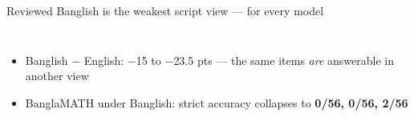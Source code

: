 \documentclass[aspectratio=169,10pt]{beamer}
\begin{document}
\begin{frame}{Reviewed Banglish is the weakest script view --- for every model}
\begin{columns}[T]
{\begin{itemize}
        \item Banglish $-$ English: $-$15 to $-$23.5 pts --- the same items \emph{are}
              answerable in another view
        \item BanglaMATH under Banglish: strict accuracy collapses to
              \textbf{0/56, 0/56, 2/56}
      \end{itemize}\par}
      \vspace{4pt}
  \end{columns}
\end{frame}
\end{document}
